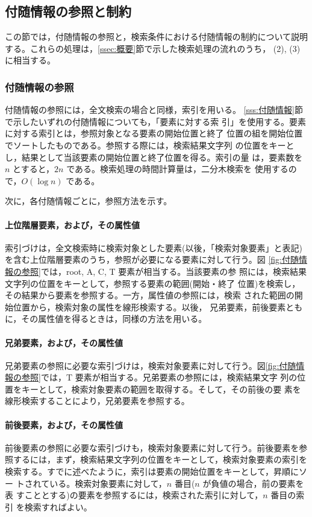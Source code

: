 \subsection{付随情報の参照と制約}
この節では，付随情報の参照と，検索条件における付随情報の制約について説明
する。これらの処理は，\ref{ssec:概要}節で示した検索処理の流れのうち，
(2), (3) に相当する。


\subsubsection{付随情報の参照}
付随情報の参照には，全文検索の場合と同様，索引を用いる。
\ref{sss:付随情報}節で示したいずれの付随情報についても，「要素に対する索
引」を使用する。要素に対する索引とは，参照対象となる要素の開始位置と終了
位置の組を開始位置でソートしたものである。参照する際には，検索結果文字列
の位置をキーとし，結果として当該要素の開始位置と終了位置を得る。索引の量
は，要素数を $n$ とすると，$2n$ である。検索処理の時間計算量は，二分木検索を
使用するので，$O(\log n)$ である。

次に，各付随情報ごとに，参照方法を示す。

\paragraph{上位階層要素，および，その属性値}
索引づけは，全文検索時に検索対象とした要素(以後，「検索対象要素」と表記)
を含む上位階層要素のうち，参照が必要になる要素に対して行う。図
\ref{fig:付随情報の参照}では，root, A, C, T 要素が相当する。当該要素の参
照には，検索結果文字列の位置をキーとして，参照する要素の範囲(開始・終了
位置)を検索し，その結果から要素を参照する。一方，属性値の参照には，検索
された範囲の開始位置から，検索対象の属性を線形検索する。以後，
兄弟要素，前後要素ともに，その属性値を得るときは，同様の方法を用いる。


\paragraph{兄弟要素，および，その属性値}
兄弟要素の参照に必要な索引づけは，検索対象要素に対して行う。図\ref{fig:付随情報の参照}では，T 要素が相当する。兄弟要素の参照には，検索結果文字
列の位置をキーとして，検索対象要素の範囲を取得する。そして，その前後の要
素を線形検索することにより，兄弟要素を参照する。


\paragraph{前後要素，および，その属性値}
前後要素の参照に必要な索引づけも，検索対象要素に対して行う。前後要素を参
照するには，まず，検索結果文字列の位置をキーとして，検索対象要素の索引を
検索する。すでに述べたように，索引は要素の開始位置をキーとして，昇順にソー
トされている。検索対象要素に対して，$n$ 番目($n$ が負値の場合，前の要素を表
すこととする)の要素を参照するには，検索された索引に対して，$n$ 番目の索引
を検索すればよい。

